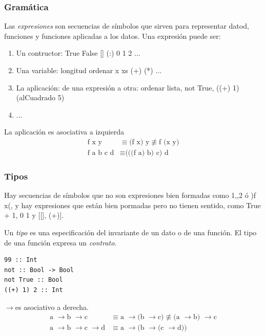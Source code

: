\documentclass[12pt]{extarticle}
\def\flecha{$\rightarrow$}
\begin{document}
\subsubsection{Gramática}
Las \textit{expresiones} son secuencias de símbolos que sirven para representar datod, funciones y funciones aplicadas a los datos. Una expresión puede ser:

\begin{enumerate}
\itemsep-0.35em 
\item Un contructor: True False [] (:) 0 1 2 ...
\item Una variable: longitud ordenar x xs (+) (*) ...
\item La aplicación: de una expresión a otra: ordenar lista,  not True,  ((+) 1) (alCuadrado 5)
\item ...
\end{enumerate}

La aplicación es asociativa a izquierda
\begin{equation}
\begin{split}
\text{f x y} & \equiv \text{(f x) y} 
\not\equiv \text{f (x y)} \\
\text{f a b c d} & \equiv \text{(((f a) b) c) d}
\end{split}
\end{equation}

\subsubsection{Tipos}
Hay secuencias de símbolos  que no son expresiones bien formadas como 1,,2 ó )f x(, y hay expresiones que están bien pormadas pero no tienen sentido, como True + 1, 0 1 y [[], (+)].

Un \textit{tipo} es una especificación del invariante de un dato o de una función. El tipo de una función expresa un \textit{contrato}.

\begin{verbatim}
99 :: Int
not :: Bool -> Bool
not True :: Bool
((+) 1) 2 :: Int
\end{verbatim}

\flecha es asociativo a derecha.
\begin{equation}
\begin{split}
\text{a \flecha b \flecha c} & \equiv \text{a \flecha (b \flecha c)} 
\not\equiv \text{(a \flecha b) \flecha c} \\
\text{a \flecha b \flecha c \flecha d} & \equiv \text{a \flecha (b \flecha (c \flecha d))}
\end{split}
\end{equation}
\end{document}
